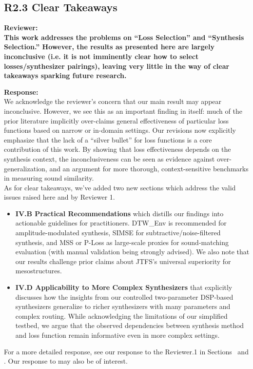 \documentclass[11pt]{article}
\begin{document}
\subsection*{R2.3 Clear Takeaways}
\noindent\textbf{Reviewer:}\\
\textbf{This work addresses the problems on ``Loss Selection'' and ``Synthesis Selection.''  However, the results as presented here are largely inconclusive (i.e. it is not imminently clear how to select losses/synthesizer pairings), leaving very little in the way of clear takeaways sparking future research.\\}

\noindent\textbf{Response:} \\
We acknowledge the reviewer’s concern that our main result may appear inconclusive. However, we see this as an important finding in itself: much of the prior literature implicitly over-claims general effectiveness of particular loss functions based on narrow or in-domain settings. Our revisions now explicitly emphasize that the lack of a “silver bullet” for loss functions is a core contribution of this work. By showing that loss effectiveness depends on the synthesis context, the inconclusiveness can be seen as evidence against over-generalization, and an argument for more thorough, context-sensitive benchmarks in measuring sound similarity.\\

As for clear takeaways, we've added two new sections which address the valid issues raised here and by Reviewer 1. 

\begin{itemize}
  \item \textbf{IV.B Practical Recommendations} which distills our findings into actionable guidelines for practitioners. DTW\_Env is recommended for amplitude-modulated synthesis, SIMSE for subtractive/noise-filtered synthesis, and MSS or P-Loss as large-scale proxies for sound-matching evaluation (with manual validation being strongly advised). We also note that our results challenge prior claims about JTFS’s universal superiority for mesostructures.
  \item \textbf{IV.D Applicability to More Complex Synthesizers} that explicitly discusses how the insights from our controlled two-parameter DSP-based synthesizers generalize to richer synthesizers with many parameters and complex routing. While acknowledging the limitations of our simplified testbed, we argue that the observed dependencies between synthesis method and loss function remain informative even in more complex settings.
\end{itemize}
For a more detailed response, see our response to the Reviewer.1 in Sections~ and . Our response to  may also be of interest.
\end{document}
